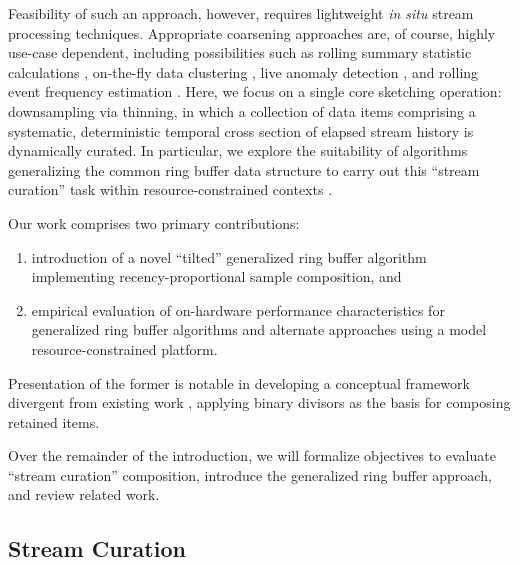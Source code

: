 Feasibility of such an approach, however, requires lightweight \textit{in situ} stream processing techniques.
Appropriate coarsening approaches are, of course, highly use-case dependent, including possibilities such as rolling summary statistic calculations \citep{lin2004continuously}, on-the-fly data clustering \citep{silva2013data}, live anomaly detection \citep{cai2004maids}, and rolling event frequency estimation \citep{manku2002approximate}.
Here, we focus on a single core sketching operation: downsampling via thinning, in which a collection of data items comprising a systematic, deterministic temporal cross section of elapsed stream history is dynamically curated.
In particular, we explore the suitability of algorithms generalizing the common ring buffer data structure to carry out this ``stream curation'' task  within resource-constrained contexts \citep{gunther2014algorithm}.

Our work comprises two primary contributions:
\begin{enumerate}
\item introduction of a novel ``tilted'' generalized ring buffer algorithm implementing recency-proportional sample composition, and
\item empirical evaluation of on-hardware performance characteristics for generalized ring buffer algorithms and alternate approaches using a model resource-constrained platform.
\end{enumerate}
Presentation of the former is notable in developing a conceptual framework divergent from existing work \citep{gunther2014algorithm}, applying binary divisors as the basis for composing retained items.

Over the remainder of the introduction, we will formalize objectives to evaluate ``stream curation'' composition, introduce the generalized ring buffer approach, and review related work.

\subsection{Stream Curation}
\label{sec:stream-curation-problem}

